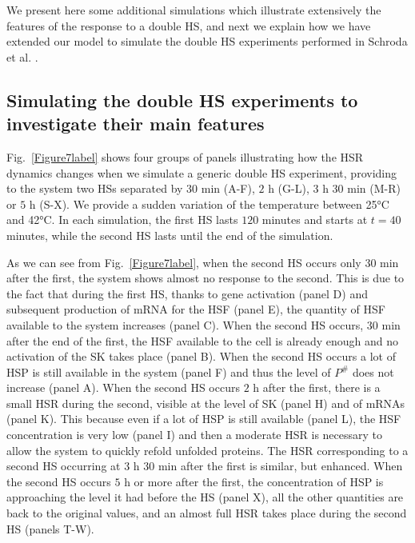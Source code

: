 \documentclass[oneside, 10pt, a4paper, twocolumn]{article}
\begin{document}
We present here some additional simulations which illustrate extensively the features of the response to a double HS, and next we explain how we have extended our model to simulate the double HS experiments performed in Schroda et al. \cite{Schroda2000}.




\subsection{Simulating the double HS experiments to investigate their main features}
\label{Sec2HSsimulations}

Fig.~\ref{Figure7label} shows four {groups} of panels illustrating how the HSR dynamics changes when we simulate a generic double HS experiment, providing to the system two HSs separated by $30$ min (A-F), $2$ h (G-L), $3$ h $30$ min (M-R) or $5$ h (S-X). We provide a sudden variation of the temperature between 25°C and 42°C. {In each simulation, the first HS lasts $120$ minutes and starts at $t=40$ minutes, while the second HS lasts until the end of the simulation.}

As we can see from Fig.~\ref{Figure7label}, when the second HS occurs only $30$ min after the first, the system shows almost no response to the second. This is due to the fact that during the first HS, thanks to gene activation (panel D) and subsequent production of mRNA for the HSF (panel E), the quantity of HSF available to the system increases (panel C). When the second HS occurs, $30$ min after the end of the first, the HSF available to the cell is already enough and no activation of the SK takes place (panel B). When the second HS occurs a lot of HSP is still available in the system (panel F) and thus the level of $P^\#$ does not increase (panel A). When the second HS occurs $2$ h after the first, there is a small HSR during the second, visible at the level of SK (panel H) and of mRNAs (panel K). This because even if a lot of HSP is still available (panel L), the HSF concentration is very low (panel I) and then a moderate HSR is necessary to allow the system to quickly refold unfolded proteins. 
The HSR corresponding to a second HS occurring at $3$ h $30$ min after the first is similar, but enhanced. 
When the second HS occurs $5$ h or more after the first, the concentration of HSP is approaching the level it had before the HS (panel X), all the other quantities are back to the original values, and an almost full HSR takes place during the second HS (panels T-W). 
\end{document}
